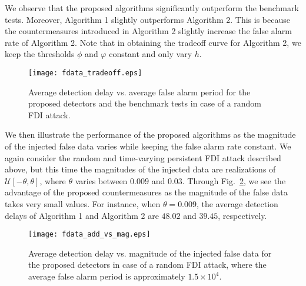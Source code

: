 \documentclass[onecolumn]{IEEEtran}
\begin{document}
We observe that the proposed algorithms significantly outperform the benchmark tests. Moreover, Algorithm 1 slightly outperforms Algorithm 2. This is because the countermeasures introduced in Algorithm 2 slightly increase the false alarm rate of Algorithm 2. Note that in obtaining the tradeoff curve for Algorithm 2, we keep the thresholds $\phi$ and $\varphi$ constant and only vary $h$.


\begin{figure}
\center
  \texttt{[image: fdata\_tradeoff.eps]}
\caption{Average detection delay vs. average false alarm period for the proposed detectors and the benchmark tests in case of a random FDI attack.}
 \label{fig:fdata_tradeoff}
\end{figure}

We then illustrate the performance of the proposed algorithms as the magnitude of the injected false data varies while keeping the false alarm rate constant. We again consider the random and time-varying persistent FDI attack described above, but this time the magnitudes of the injected data are realizations of $\mathcal{U}[-\theta,\theta]$, where $\theta$ varies between $0.009$ and $0.03$. Through Fig.~\ref{fig:fdata_add_vs_mag}, we see the advantage of the proposed countermeasures as the magnitude of the false data takes very small values. For instance, when $\theta = 0.009$, the average detection delays of Algorithm 1 and Algorithm 2 are $48.02$ and $39.45$, respectively.

\begin{figure}
\center
  \texttt{[image: fdata\_add\_vs\_mag.eps]}
  \vspace{-0.1cm}
\caption{Average detection delay vs. magnitude of the injected false data for the proposed detectors in case of a random FDI attack, where the average false alarm period is approximately $1.5\times10^{4}$.}
 \label{fig:fdata_add_vs_mag}
\end{figure}
\end{document}
